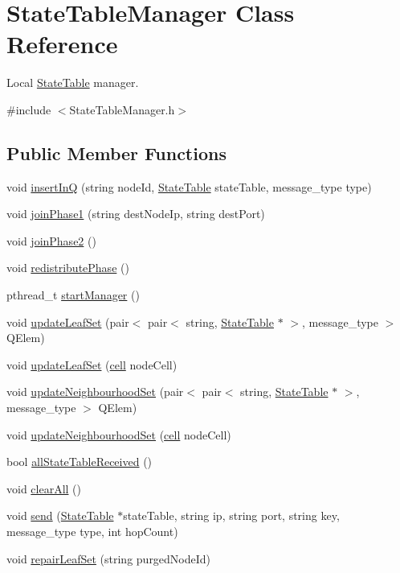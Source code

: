 \hypertarget{classStateTableManager}{\section{State\-Table\-Manager Class Reference}
\label{classStateTableManager}
}


Local \hyperlink{structStateTable}{State\-Table} manager.  




{\ttfamily \#include $<$State\-Table\-Manager.\-h$>$}

\subsection*{Public Member Functions}
\begin{DoxyCompactItemize}
\item 
void \hyperlink{classStateTableManager_ad2aaa2cdc795223ae340339624a651cf}{insert\-In\-Q} (string node\-Id, \hyperlink{structStateTable}{State\-Table} state\-Table, message\-\_\-type type)
\item 
void \hyperlink{classStateTableManager_ad68c33a035e6bcefc9d39967215167cf}{join\-Phase1} (string dest\-Node\-Ip, string dest\-Port)
\item 
void \hyperlink{classStateTableManager_a5ac5b05aaf12903dcfb484b432de477c}{join\-Phase2} ()
\item 
void \hyperlink{classStateTableManager_ae65f0a114e7d9a5d8b83b6ef4599bfcc}{redistribute\-Phase} ()
\item 
pthread\-\_\-t \hyperlink{classStateTableManager_a25e083df1453ad8f08f447050546d072}{start\-Manager} ()
\item 
void \hyperlink{classStateTableManager_a6685eaf336e005c138797a0cbe5d6e61}{update\-Leaf\-Set} (pair$<$ pair$<$ string, \hyperlink{structStateTable}{State\-Table} $\ast$ $>$, message\-\_\-type $>$ Q\-Elem)
\item 
void \hyperlink{classStateTableManager_afa8cb85da489510d64e61001768366d0}{update\-Leaf\-Set} (\hyperlink{structcell}{cell} node\-Cell)
\item 
void \hyperlink{classStateTableManager_ab9e8881bb8e3fb0a5df3f165e05322a0}{update\-Neighbourhood\-Set} (pair$<$ pair$<$ string, \hyperlink{structStateTable}{State\-Table} $\ast$ $>$, message\-\_\-type $>$ Q\-Elem)
\item 
void \hyperlink{classStateTableManager_a9fdbd4242382669d7c0db1a81ac77f96}{update\-Neighbourhood\-Set} (\hyperlink{structcell}{cell} node\-Cell)
\item 
bool \hyperlink{classStateTableManager_aef91ab7cba7738cd9dd6b3c8ab8453e1}{all\-State\-Table\-Received} ()
\item 
void \hyperlink{classStateTableManager_a6a0df095e2d24f3b0d9727d8c1f5f1dd}{clear\-All} ()
\item 
void \hyperlink{classStateTableManager_ae91725ab5cfea9b3c4642826b37ceeaf}{send} (\hyperlink{structStateTable}{State\-Table} $\ast$state\-Table, string ip, string port, string key, message\-\_\-type type, int hop\-Count)
\item 
void \hyperlink{classStateTableManager_a20199103d4cf32aa63aab82a1d441137}{repair\-Leaf\-Set} (string purged\-Node\-Id)
\end{DoxyCompactItemize}

